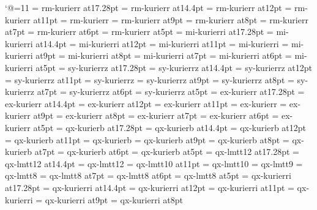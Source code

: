 \catcode`@=11
\font\seventeenrm=  rm-kurierr at17.28pt
\font\fourteenrm=   rm-kurierr at14.4pt
\font\twelverm=     rm-kurierr at12pt
\font\elevenrm=     rm-kurierr at11pt
\font\tenrm=        rm-kurierr
\font\ninerm=       rm-kurierr at9pt
\font\eightrm=      rm-kurierr at8pt
\font\sevenrm=      rm-kurierr at7pt
\font\sixrm=        rm-kurierr at6pt
\font\fiverm=       rm-kurierr at5pt
\font\seventeeni=   mi-kurierri at17.28pt
\font\fourteeni=    mi-kurierri at14.4pt
\font\twelvei=      mi-kurierri at12pt
\font\eleveni=      mi-kurierri at11pt
\font\teni=         mi-kurierri
\font\ninei=        mi-kurierri at9pt
\font\eighti=       mi-kurierri at8pt
\font\seveni=       mi-kurierri at7pt
\font\sixi=         mi-kurierri at6pt
\font\fivei=        mi-kurierri at5pt
\font\seventeensy=  sy-kurierrz at17.28pt
\font\fourteensy=   sy-kurierrz at14.4pt
\font\twelvesy=     sy-kurierrz at12pt
\font\elevensy=     sy-kurierrz at11pt
\font\tensy=        sy-kurierrz
\font\ninesy=       sy-kurierrz at9pt
\font\eightsy=      sy-kurierrz at8pt
\font\sevensy=      sy-kurierrz at7pt
\font\sixsy=        sy-kurierrz at6pt
\font\fivesy=       sy-kurierrz at5pt
\font\seventeenex=  ex-kurierr at17.28pt
\font\fourteenex=   ex-kurierr at14.4pt
\font\twelveex=     ex-kurierr at12pt
\font\elevenex=     ex-kurierr at11pt
\font\tenex=        ex-kurierr
\font\nineex=       ex-kurierr at9pt
\font\eightex=      ex-kurierr at8pt
\font\sevenex=      ex-kurierr at7pt
\font\sixex=        ex-kurierr at6pt
\font\fiveex=       ex-kurierr at5pt
\font\seventeenbf=  qx-kurierb at17.28pt
\font\fourteenbf=   qx-kurierb at14.4pt
\font\twelvebf=     qx-kurierb at12pt
\font\elevenbf=     qx-kurierb at11pt
\font\tenbf=        qx-kurierb
\font\ninebf=       qx-kurierb at9pt
\font\eightbf=      qx-kurierb at8pt
\font\sevenbf=      qx-kurierb at7pt
\font\sixbf=        qx-kurierb at6pt
\font\fivebf=       qx-kurierb at5pt
\font\seventeentt=  qx-lmtt12 at17.28pt
\font\fourteentt=   qx-lmtt12 at14.4pt
\font\twelvett=     qx-lmtt12
\font\eleventt=     qx-lmtt10 at11pt
\font\tentt=        qx-lmtt10
\font\ninett=       qx-lmtt9
\font\eighttt=      qx-lmtt8
\font\seventt=      qx-lmtt8 at7pt
\font\sixtt=        qx-lmtt8 at6pt
\font\fivett=       qx-lmtt8 at5pt
\font\seventeenit=  qx-kurierri at17.28pt
\font\fourteenit=   qx-kurierri at14.4pt
\font\twelveit=     qx-kurierri at12pt
\font\elevenit=     qx-kurierri at11pt
\font\tenit=        qx-kurierri
\font\nineit=       qx-kurierri at9pt
\font\eightit=      qx-kurierri at8pt
